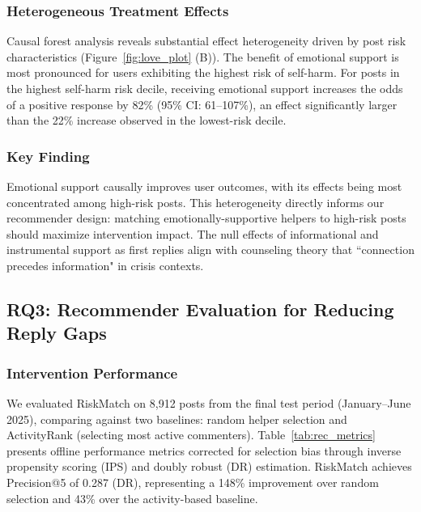 \documentclass[letterpaper]{article} %
\begin{document}
\subsubsection{Heterogeneous Treatment Effects}

Causal forest analysis reveals substantial effect heterogeneity driven by post risk characteristics (Figure~\ref{fig:love_plot} (B)). The benefit of emotional support is most pronounced for users exhibiting the highest risk of self-harm. For posts in the highest self-harm risk decile, receiving emotional support increases the odds of a positive response by 82\% (95\% CI: 61–107\%), an effect significantly larger than the 22\% increase observed in the lowest-risk decile.

\subsubsection{Key Finding} 
Emotional support causally improves user outcomes, with its effects being most concentrated among high-risk posts. This heterogeneity directly informs our recommender design: matching emotionally-supportive helpers to high-risk posts should maximize intervention impact. The null effects of informational and instrumental support as first replies align with counseling theory that ``connection precedes information" in crisis contexts.

\subsection{RQ3: Recommender Evaluation for Reducing Reply Gaps}

\subsubsection{Intervention Performance}

We evaluated RiskMatch on 8,912 posts from the final test period (January–June 2025), comparing against two baselines: random helper selection and ActivityRank (selecting most active commenters). Table~\ref{tab:rec_metrics} presents offline performance metrics corrected for selection bias through inverse propensity scoring (IPS) and doubly robust (DR) estimation. RiskMatch achieves Precision@5 of 0.287 (DR), representing a 148\% improvement over random selection and 43\% over the activity-based baseline.
\end{document}
